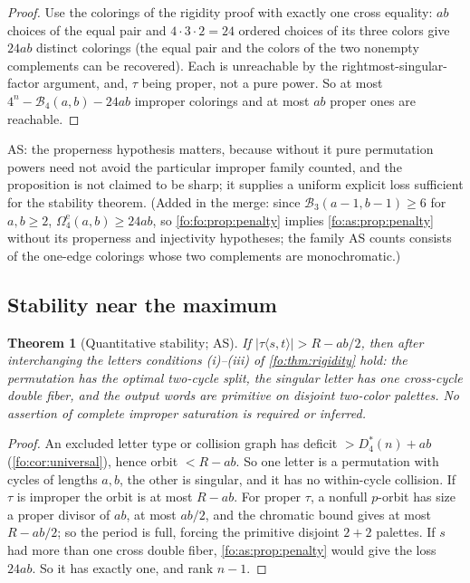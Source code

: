 \documentclass[11pt,a4paper]{article}
\numberwithin{equation}{section}
\newtheorem{theorem}{Theorem}[section]
\theoremstyle{definition}
\theoremstyle{remark}
\newcommand{\Bip}{\mathcal B}
\begin{document}
\begin{proof}
Use the colorings of the rigidity proof with exactly one cross equality:
$ab$ choices of the equal pair and $4\cdot3\cdot2=24$ ordered choices of its
three colors give $24ab$ distinct colorings (the equal pair and the colors of
the two nonempty complements can be recovered). Each is unreachable by the
rightmost-singular-factor argument, and, $\tau$ being proper, not a pure
power. So at most $4^n-\Bip_4(a,b)-24ab$ improper colorings and at most $ab$
proper ones are reachable.
\end{proof}

AS: the properness hypothesis matters, because without it pure permutation
powers need not avoid the particular improper family counted, and the
proposition is not claimed to be sharp; it supplies a uniform explicit loss
sufficient for the stability theorem. (Added in the merge: since
$\Bip_3(a-1,b-1)\ge6$ for $a,b\ge2$, $\Omega^{\mathrm e}_4(a,b)\ge24ab$, so
\cref{fo:fo:prop:penalty} implies \cref{fo:as:prop:penalty} without its
properness and injectivity hypotheses; the family AS counts consists of
the one-edge colorings whose two complements are monochromatic.)

\subsection{Stability near the maximum}

\begin{theorem}[Quantitative stability; AS]\label{fo:as:thm:stability}
If $|\tau\langle s,t\rangle|>R-ab/2$, then after interchanging the letters
conditions \textup{(i)--(iii)} of \cref{fo:thm:rigidity} hold: the permutation
has the optimal two-cycle split, the singular letter has one cross-cycle
double fiber, and the output words are primitive on disjoint two-color
palettes. No assertion of complete improper saturation is required or
inferred.
\end{theorem}

\begin{proof}
An excluded letter type or collision graph has deficit $>D^*_4(n)+ab$
(\cref{fo:cor:universal}), hence orbit $<R-ab$. So one letter is a permutation
with cycles of lengths $a,b$, the other is singular, and it has no
within-cycle collision. If $\tau$ is improper the orbit is at most $R-ab$. For
proper $\tau$, a nonfull $p$-orbit has size a proper divisor of $ab$, at most
$ab/2$, and the chromatic bound gives at most $R-ab/2$; so the period is full,
forcing the primitive disjoint $2+2$ palettes. If $s$ had more than one cross
double fiber, \cref{fo:as:prop:penalty} would give the loss $24ab$. So it has
exactly one, and rank $n-1$.
\end{proof}
\end{document}

